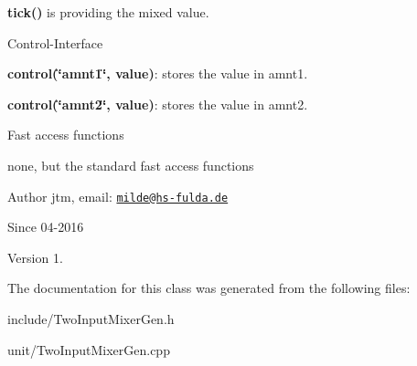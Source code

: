\begin{DoxyItemize}
\item {\bfseries tick()} is providing the mixed value.
\end{DoxyItemize}

Control-\/\+Interface


\begin{DoxyItemize}
\item {\bfseries control(\char`\"{}amnt1\char`\"{}, value)}\+: stores the value in amnt1.
\item {\bfseries control(\char`\"{}amnt2\char`\"{}, value)}\+: stores the value in amnt2.
\end{DoxyItemize}

Fast access functions
\begin{DoxyItemize}
\item none, but the standard fast access functions
\end{DoxyItemize}

\begin{DoxyAuthor}{Author}
jtm, email\+:  \href{mailto:milde@hs-fulda.de}{\tt milde@hs-\/fulda.\+de} 
\end{DoxyAuthor}
\begin{DoxySince}{Since}
04-\/2016 
\end{DoxySince}
\begin{DoxyVersion}{Version}
1. 
\end{DoxyVersion}


The documentation for this class was generated from the following files\+:\begin{DoxyCompactItemize}
\item 
include/Two\+Input\+Mixer\+Gen.\+h\item 
unit/Two\+Input\+Mixer\+Gen.\+cpp\end{DoxyCompactItemize}

